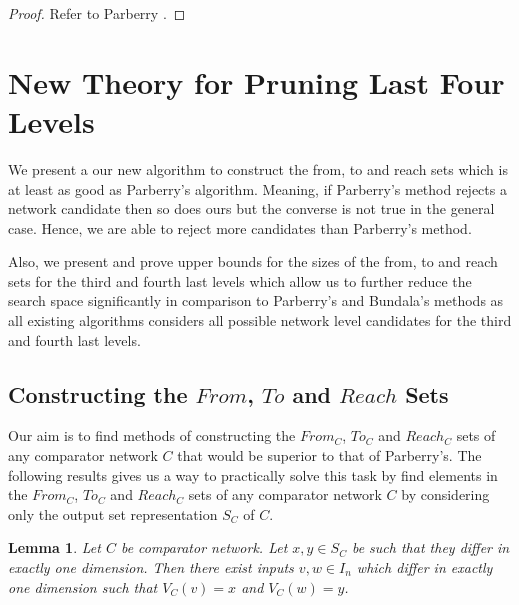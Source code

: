 \documentclass[13pt,a4paper]{article}
\newtheorem{lemma}[theorem]{Lemma}
\begin{document}
\begin{proof}
Refer to Parberry \cite{Parberry89}.
\end{proof}





\section{New Theory for Pruning Last Four Levels}
\label{sec:new:theory}

We present a our new algorithm to construct the from, to and reach sets which is at least as good as Parberry's algorithm. Meaning, if Parberry's method rejects a network candidate then so does ours but the converse is not true in the general case. Hence, we are able to reject more candidates than Parberry's method.

Also, we present and prove upper bounds for the sizes of the from, to and reach sets for the third and fourth last levels which allow us to further reduce the search space significantly in comparison to Parberry's and Bundala's methods as all existing algorithms considers all possible network level candidates for the third and fourth last levels.


\subsection{Constructing the $From$, $To$ and $Reach$ Sets}
\label{sec:construct_reach}

Our aim is to find methods of constructing the $From_C$, $To_C$ and $Reach_C$ sets of any comparator network $C$ that would be superior to that of Parberry's. The following results gives us a way to practically solve this task by find elements in the $From_C$, $To_C$ and $Reach_C$ sets of any comparator network $C$ by considering only the output set representation $S_C$ of $C$. 

\begin{lemma}
\label{lem:OutputSetsDiff}
Let $C$ be comparator network. Let $x, y \in S_C$ be such that they differ in exactly one dimension. Then there exist inputs $v, w \in I_n$ which differ in exactly one dimension such that $V_C(v) = x$ and $V_C(w) = y$. 
\end{lemma}
\end{document}
